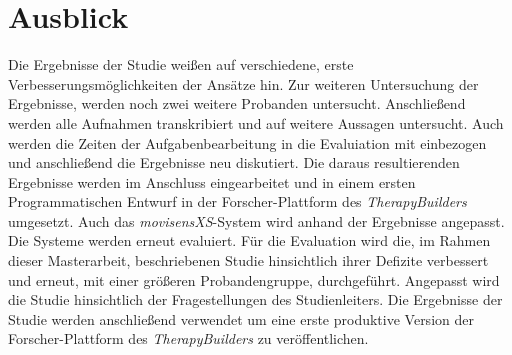 
\chapter{Ausblick}
\label{ch:FutureWork}
%

Die Ergebnisse der Studie weißen auf verschiedene, erste Verbesserungsmöglichkeiten der Ansätze hin. Zur weiteren Untersuchung der Ergebnisse, werden noch zwei weitere Probanden untersucht. Anschließend werden alle Aufnahmen transkribiert und auf weitere Aussagen untersucht. Auch werden die Zeiten der Aufgabenbearbeitung in die Evaluiation mit einbezogen und anschließend die Ergebnisse neu diskutiert. Die daraus resultierenden Ergebnisse werden im Anschluss eingearbeitet und in einem ersten Programmatischen Entwurf in der Forscher-Plattform des \emph{TherapyBuilders} umgesetzt. Auch das \emph{movisensXS}-System wird anhand der Ergebnisse angepasst. Die Systeme werden erneut evaluiert. Für die Evaluation wird die, im Rahmen dieser Masterarbeit, beschriebenen Studie hinsichtlich ihrer Defizite verbessert und erneut, mit einer größeren Probandengruppe, durchgeführt. Angepasst wird die Studie hinsichtlich der Fragestellungen des Studienleiters. Die Ergebnisse der Studie werden anschließend verwendet um eine erste produktive Version der Forscher-Plattform des \emph{TherapyBuilders} zu veröffentlichen.